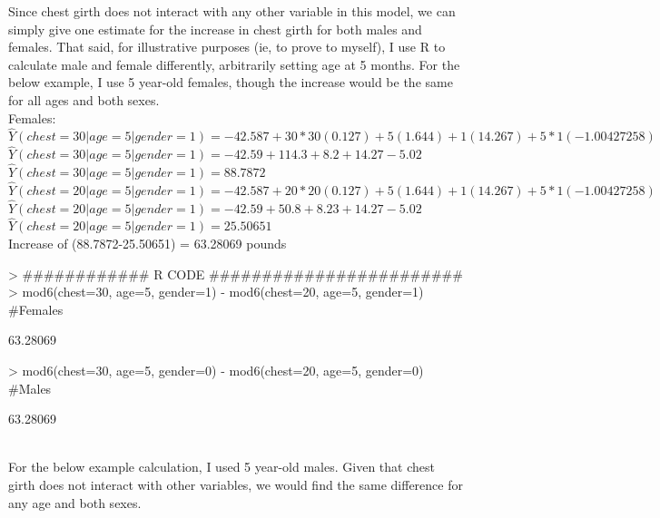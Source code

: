 \documentclass{article}
\begin{document}
Since chest girth does not interact with any other variable in this model, we can simply give one estimate for the increase in chest girth for both males and females.  That said, for illustrative purposes (ie, to prove to myself), I use R to calculate male and female differently, arbitrarily setting age at 5 months. For the below example, I use 5 year-old females, though the increase would be the same for all ages and both sexes. \\

\noindent Females: $\hat{Y}(chest=30|age=5|gender=1) = -42.587 + 30*30(0.127) + 5(1.644) + 1(14.267) + 5*1(-1.00427258)$ \\ 
$\hat{Y}(chest=30|age=5|gender=1) = -42.59 + 114.3 + 8.2 + 14.27 - 5.02$ \\ 
$\hat{Y}(chest=30|age=5|gender=1) =  88.7872 $ \\ 

\noindent $\hat{Y}(chest=20|age=5|gender=1) = -42.587 + 20*20(0.127) + 5(1.644) + 1(14.267) + 5*1(-1.00427258)$ \\ 
$\hat{Y}(chest=20|age=5|gender=1) = -42.59 + 50.8 + 8.23 + 14.27 - 5.02$ \\ 
$\hat{Y}(chest=20|age=5|gender=1) = 25.50651 $ \\

\noindent Increase of (88.7872-25.50651) = 63.28069 pounds \\



\begin{Schunk}
\begin{Sinput}
> ############ R CODE ########################
> mod6(chest=30, age=5, gender=1) - mod6(chest=20, age=5, gender=1) #Females
\end{Sinput}
\begin{Soutput}
[1] 63.28069
\end{Soutput}
\begin{Sinput}
> mod6(chest=30, age=5, gender=0) - mod6(chest=20, age=5, gender=0) #Males
\end{Sinput}
\begin{Soutput}
[1] 63.28069
\end{Soutput}
\end{Schunk}


 \\
For the below example calculation, I used 5 year-old males.  Given that chest girth does not interact with other variables, we would find the same difference for any age and both sexes.
\end{document}
